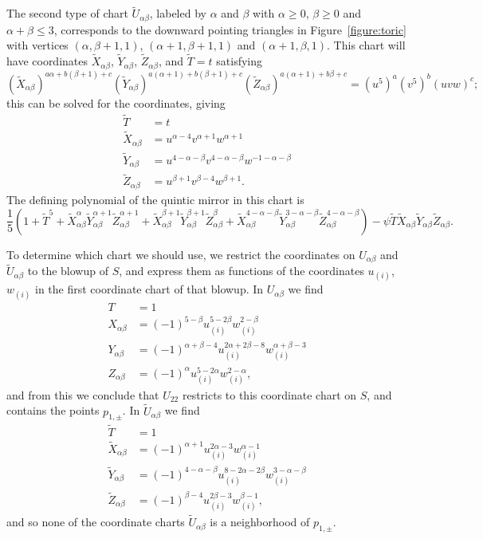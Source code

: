 The second type of chart
$\widetilde{U}_{\alpha\beta}$, labeled by
$\alpha$ and $\beta$ with $\alpha\ge0$, $\beta\ge0$ and $\alpha+\beta\le3$,
corresponds to the downward pointing triangles in Figure~\ref{figure:toric}
with vertices $(\alpha,\beta+1,1)$, $(\alpha+1,\beta+1,1)$ and 
$(\alpha+1,\beta,1)$.  
This chart will have coordinates $\widetilde{X}_{\alpha\beta}$, 
$\widetilde{Y}_{\alpha\beta}$,
$\widetilde{Z}_{\alpha\beta}$, and $\widetilde{T}=t$ satisfying
\[ 
(\widetilde{X}_{\alpha\beta})^{a\alpha+b(\beta+1)+c}
(\widetilde{Y}_{\alpha\beta})^{a(\alpha+1)+b(\beta+1)+c}
(\widetilde{Z}_{\alpha\beta})^{a(\alpha+1)+b\beta+c}
= (u^5)^a(v^5)^b(uvw)^c;
\]
this can be solved for the coordinates, giving
\begin{align*}
\widetilde{T}&=t\\
\widetilde{X}_{\alpha\beta} &= u^{\alpha-4}v^{\alpha+1}w^{\alpha+1}\\
\widetilde{Y}_{\alpha\beta} &= u^{4-\alpha-\beta}v^{4-\alpha-\beta}w^{-1-\alpha-\beta}\\
\widetilde{Z}_{\alpha\beta} &= u^{\beta+1}v^{\beta-4}w^{\beta+1}.
\end{align*}
The defining polynomial of the quintic mirror in this chart is
\[ \frac15\left(1+\widetilde{T}^5
+\widetilde{X}_{\alpha\beta}^\alpha \widetilde{Y}_{\alpha\beta}^{\alpha+1} \widetilde{Z}_{\alpha\beta}^{\alpha+1}
+\widetilde{X}_{\alpha\beta}^{\beta+1} \widetilde{Y}_{\alpha\beta}^{\beta+1} \widetilde{Z}_{\alpha\beta}^{\beta}
+\widetilde{X}_{\alpha\beta}^{4-\alpha-\beta} \widetilde{Y}_{\alpha\beta}^{3-\alpha-\beta} \widetilde{Z}_{\alpha\beta}^{4-\alpha-\beta}
\right)-\psi \widetilde{T}\widetilde{X}_{\alpha\beta}\widetilde{Y}_{\alpha\beta}\widetilde{Z}_{\alpha\beta}.
\]


To determine which chart we should use, we restrict the coordinates
on $U_{\alpha\beta}$ and $\widetilde{U}_{\alpha\beta}$ to the blowup
of $S$,
and express them as functions of the coordinates $u_{(i)}$, $w_{(i)}$
in the first coordinate chart of that blowup.
In $U_{\alpha\beta}$ we find
\begin{align*}
T&=1\\
X_{\alpha\beta} &= (-1)^{5-\beta}u_{(i)}^{5-2\beta}w_{(i)}^{2-\beta}\\
Y_{\alpha\beta} &= (-1)^{\alpha+\beta-4}u_{(i)}^{2\alpha+2\beta-8}w_{(i)}^{\alpha+\beta-3}\\
Z_{\alpha\beta} &= (-1)^{\alpha}u_{(i)}^{5-2\alpha}w_{(i)}^{2-\alpha},
\end{align*}
and from this we conclude that $U_{22}$ restricts to this coordinate
chart on $S$, and contains the points $p_{1,\pm}$.  
In $\widetilde{U}_{\alpha\beta}$ we find
\begin{align*}
\widetilde{T}&=1\\
\widetilde{X}_{\alpha\beta} &= (-1)^{\alpha+1}u_{(i)}^{2\alpha-3}w_{(i)}^{\alpha-1}\\
\widetilde{Y}_{\alpha\beta} &= (-1)^{4-\alpha-\beta}u_{(i)}^{8-2\alpha-2\beta}w_{(i)}^{3-\alpha-\beta}\\
\widetilde{Z}_{\alpha\beta} &= (-1)^{\beta-4}u_{(i)}^{2\beta-3}w_{(i)}^{\beta-1},
\end{align*}
and so none of the coordinate charts $\widetilde{U}_{\alpha\beta}$ is
a neighborhood of $p_{1,\pm}$.

